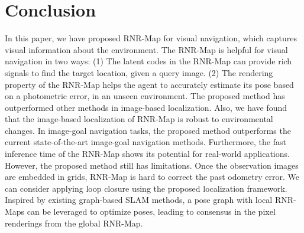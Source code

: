 \documentclass[10pt,twocolumn,letterpaper]{article}
\def\proposed{RNR-Map\xspace}
\begin{document}
\section{Conclusion}
\vspace{-0.2cm}
In this paper, we have proposed \proposed  for visual navigation, which captures visual information about the environment.
%
The \proposed is helpful for visual navigation in two ways: (1) The latent codes in the \proposed can provide rich signals to find the target location, given a query image.
%
(2) The rendering property of the \proposed helps the agent to accurately estimate its pose based on a photometric error, in an unseen environment.
%
The proposed method has outperformed other methods in image-based localization.
%
Also, we have found that the image-based localization of \proposed is robust to environmental changes.
%
In image-goal navigation tasks, the proposed method outperforms the current state-of-the-art image-goal navigation methods.
%
Furthermore, the fast inference time of the \proposed shows its potential for real-world applications.
%
However, the proposed method still has limitations.
%
Once the observation images are embedded in grids, RNR-Map is hard to correct the past odometry error. 
%
We can consider applying loop closure using the proposed localization framework. 
%
Inspired by existing graph-based SLAM methods, a pose graph with local RNR-Maps can be leveraged to optimize poses, leading to consensus in the pixel renderings from the global RNR-Map.
%


{\small


}

\clearpage
\appendix
\end{document}
